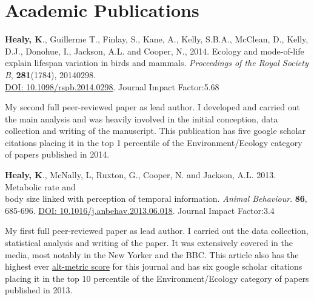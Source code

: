 \documentclass[10pt,a4paper]{article}
\begin{document}
\section{Academic Publications}
\begin{flushleft}
\textbf{Healy, K}., Guillerme T., Finlay, S., Kane, A., Kelly, S.B.A., McClean, D., Kelly, D.J., Donohue, I., Jackson, A.L. and Cooper, N., 2014. Ecology and mode-of-life explain lifespan variation in birds and mammals. \textit{Proceedings of the Royal Society B}, \textbf{281}(1784), 20140298.\\ \href{http://rspb.royalsocietypublishing.org/content/281/1784/20140298.full.pdf?keytype=ref&ijkey=gPt28ElSAYBvRhZ}{DOI: 10.1098/rspb.2014.0298}. Journal Impact Factor:5.68
\smallskip
\par{\fontsize{10.5}{10}\selectfont My second full peer-reviewed paper as lead author. I developed and carried out the main analysis and was heavily involved in the initial conception, data collection and writing of the manuscript. This publication has five google scholar citations placing it in the top 1 percentile of the Environment/Ecology category of papers published in 2014.}

\bigskip

\textbf{Healy, K}., McNally, L, Ruxton, G., Cooper, N. and Jackson, A.L. 2013. Metabolic rate and\\
body size linked with perception of temporal information.  \textit{Animal Behaviour}. \textbf{86}, 685-696. \href{http://dx.doi.org/10.1016/j.anbehav.2013.06.018}{DOI: 10.1016/j.anbehav.2013.06.018}. Journal Impact Factor:3.4
\smallskip
\par{\fontsize{10.5}{10}\selectfont My first full peer-reviewed paper as lead author. I carried out the data collection, statistical analysis and writing of the paper. It was extensively covered in the media, most notably in the New Yorker and the BBC. This article also has the highest ever \href{http://www.altmetric.com/details.php?key=517059da36b98ab7d4941284da32e5f7&citation_id=1705703&embedded=true}{alt-metric score} for this journal and has six google scholar citations placing it in the top 10 percentile of the Environment/Ecology category of papers published in 2013.} %

\bigskip


\end{flushleft}
\end{document}
